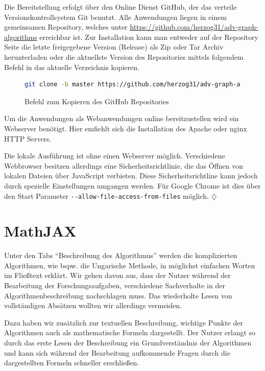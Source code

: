 Die Bereitstellung erfolgt über den Online Dienst GitHub, der das verteile Versionskontrollsystem Git benutzt. 
Alle Anwendungen liegen in einem gemeinsamen Repository, welches unter \url{https://github.com/herzog31/adv-graph-algorithms} erreichbar ist. Zur Installation kann man entweder auf der Repository Seite die letzte freigegebene Version (Release) als Zip oder Tar Archiv herunterladen oder die aktuellste Version des Repositories mittels folgendem Befehl in das aktuelle Verzeichnis kopieren.

\begin{figure}[h!]
\begin{lstlisting}[language=Bash]
git clone -b master https://github.com/herzog31/adv-graph-algorithms.git
\end{lstlisting}
\caption[Installation: Repository kopieren]{Befehl zum Kopieren des GitHub Repositories}\label{fig:listing-github}
\end{figure}

Um die Anwendungen als Webanwendungen online bereitzustellen wird ein Webserver benötigt. Hier emfiehlt sich die Installation des Apache oder nginx  HTTP Servers.

Die lokale Ausführung ist ohne einen Webserver möglich. Verschiedene Webbrowser besitzen allerdings eine Sicherheitsrichtlinie, die das Öffnen von lokalen Dateien über JavaScript verbieten. Diese Sicherheitsrichtline kann jedoch durch spezielle Einstellungen umgangen werden. Für Google Chrome ist dies über den Start Parameter \texttt{-{}-allow-file-access-from-files} möglich. \hfill$\diamondsuit$

\section{MathJAX} %
Unter den Tabs \enquote{Beschreibung des Algorithmus} werden die komplizierten Algorithmen, wie bspw. die Ungarische Methode, in möglichst einfachen Worten im Fließtext erklärt. Wir gehen davon aus, dass der Nutzer während der Bearbeitung der Forschungsaufgaben, verschiedene Sachverhalte in der Algorithmenbeschreibung nachschlagen muss. Das wiederholte Lesen von vollständigen Absätzen wollten wir allerdings vermeiden.

Dazu haben wir zusätzlich zur textuellen Beschreibung, wichtige Punkte der Algorithmen auch als mathematische Formeln dargestellt. Der Nutzer erlangt so durch das erste Lesen der Beschreibung ein Grundverständnis der Algorithmen und kann sich während der Bearbeitung aufkommende Fragen durch die dargestellten Formeln schneller erschließen.

